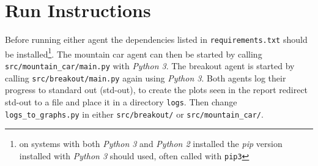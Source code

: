 \section{Run Instructions}
\label{sec:run_instructions}
Before running either agent the dependencies listed in \texttt{requirements.txt} should be installed\footnote{on systems with both \textit{Python 3} and \textit{Python 2} installed the \textit{pip} version installed with \textit{Python 3} should used, often called with \texttt{pip3}}.%
%
The mountain car agent can then be started by calling \texttt{src/mountain\_car/main.py} with \textit{Python 3}. The breakout agent is started by calling \texttt{src/breakout/main.py} again using \textit{Python 3}. Both agents log their progress to standard out (std-out), to create the plots seen in the report redirect std-out to a file and place it in a directory \texttt{logs}. Then change \texttt{logs\_to\_graphs.py} in either \texttt{src/breakout/} or \texttt{src/mountain\_car/}.